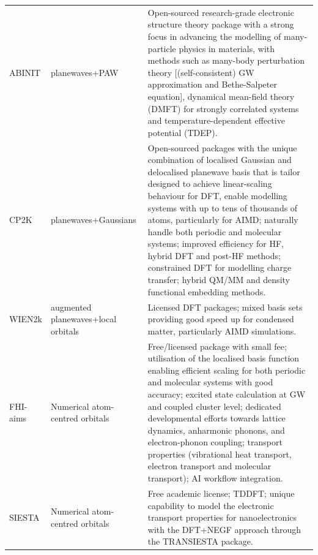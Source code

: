 \begin{longtable}{p{2cm}p{3cm}p{12.5cm}}
      \footnotesize{ABINIT\cite{gonze2009abinit}}  
            & \footnotesize{planewaves+PAW}  
            & \footnotesize{Open-sourced research-grade electronic structure theory package with a strong  focus in advancing the modelling of many-particle physics in materials, with methods such as many-body perturbation theory [(self-consistent) GW approximation and Bethe-Salpeter   equation], dynamical mean-field theory (DMFT)\cite{kotliar2006electronic} for strongly correlated systems and temperature-dependent effective potential (TDEP).}\\
            
      \footnotesize{CP2K\cite{cp2k_package}} 
            & \footnotesize{planewaves+Gaussians} 
            & \footnotesize{Open-sourced  packages with the unique combination of localised Gaussian and delocalised planewave basis that is tailor designed to achieve linear-scaling behaviour for DFT, enable modelling systems with up to tens of thousands of atoms, particularly for AIMD; naturally handle both periodic and molecular systems; improved efficiency for HF, hybrid DFT and post-HF methods; constrained DFT for modelling charge transfer; hybrid QM/MM and density functional embedding methods.}\\
            
      \footnotesize{WIEN2k\cite{blaha2020wien2k}}
            & \footnotesize{augmented planewaves+local orbitals} 
            & \footnotesize{Licensed DFT packages; mixed basis sets providing good speed up for condensed matter, particularly AIMD simulations.}\\

      \footnotesize{FHI-aims\cite{blum2009ab,abbott2025roadmap}}
            &\footnotesize{Numerical atom-centred orbitals} & \footnotesize{Free/licensed package with small fee; utilisation of the localised basis function enabling efficient scaling for both periodic and molecular systems with good accuracy; excited state calculation at GW and coupled cluster level; dedicated developmental efforts towards lattice dynamics, anharmonic phonons, and electron-phonon coupling; transport properties (vibrational heat transport, electron transport and molecular transport); AI workflow integration.} \\
      
      \footnotesize{SIESTA}\cite{garcia2020siesta}
            &\footnotesize{Numerical atom-centred orbitals}  & \footnotesize{Free academic license; TDDFT; unique capability to model the electronic transport properties for nanoelectronics with the DFT+NEGF approach through the TRANSIESTA package.\cite{stokbro2003transiesta,papior2017improvements,wittemeier2025quantum}}\\
            

\end{longtable}
